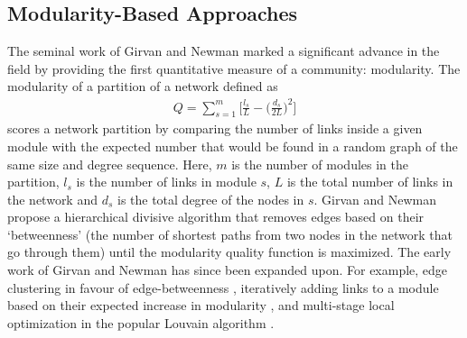 \documentclass{report}
\begin{document}
	\subsection{Modularity-Based Approaches}
	The seminal work of Girvan and Newman \cite{girvan2002community} marked a significant advance in the field by providing the first quantitative measure of a community: modularity. 
	The modularity of a partition of a network 
	defined as
	\begin{align} 
	\label{modularity}
	Q = \sum_{s=1}^m \bigg[ \frac{l_s}{L} - \bigg( \frac{d_s}{2L} \bigg)^2\bigg]
	\end{align}
	scores a network partition by comparing the number of links inside a given module with the expected number that would be found in a random graph of the same size and degree sequence. 
	Here, $m$ is the number of modules in the partition, $l_s$ is the number of links in module $s$, $L$ is the total number of links in the network and $d_s$ is the total degree of the nodes in $s$. 
	Girvan and Newman propose a hierarchical divisive algorithm that removes edges based on their `betweenness' (the number of shortest paths from two nodes in the network that go through them) until the modularity quality function is maximized. 
	The early work of Girvan and Newman has since been expanded upon.
	For example, edge clustering in favour of edge-betweenness \cite{radicchi2004defining}, iteratively adding links to a module based on their expected increase in modularity \cite{clauset2004finding}, and multi-stage local optimization in the popular Louvain algorithm \cite{blondel2008fast}.
	
	
\end{document}
